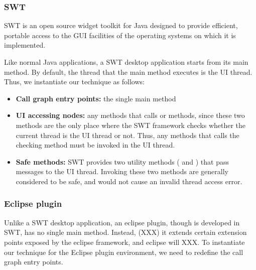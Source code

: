 

\subsubsection{SWT}

SWT is an open source widget toolkit for Java designed to provide efficient,
portable access to the GUI facilities of the operating systems on which it is implemented.

Like normal Java applications, a SWT desktop application starts from its main method.
By default, the thread that the main method executes is the UI thread. Thus, we instantiate
our technique as follows:

\begin{itemize}

\item \textbf{Call graph entry points: } the single main method

\item \textbf{UI accessing nodes: } any methods that calls 
or  methods, since these two methods are the
only place where the SWT framework checks whether the current thread is the UI thread or not. Thus, any
methods that calls the checking method must be invoked in the UI thread.

\item \textbf{Safe methods: } SWT provides two utility methods (
and ) that pass messages to the UI thread.
 Invoking these two methods are generally considered to be safe, and would not
cause an invalid thread access error.

\end{itemize}

\subsubsection{Eclipse plugin}

Unlike a SWT desktop application, an eclipse plugin, though is developed in SWT,
has no single main method. Instead, (XXX) it extends certain extension points
exposed by the eclipse framework, and eclipse will XXX. To instantiate our
technique for the Eclipse plugin environment, we need to redefine the
call graph entry points.

